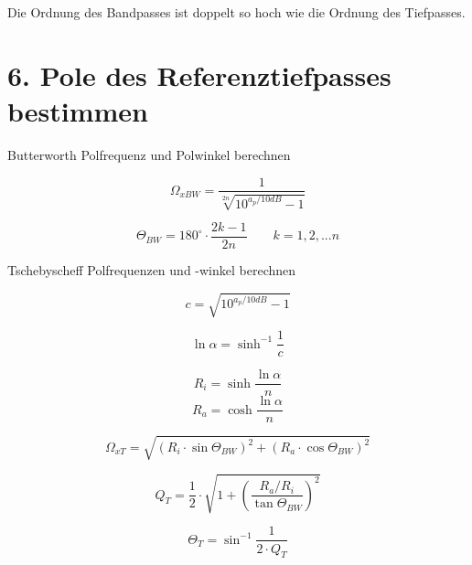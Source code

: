 \documentclass[a4paper, 12pt]{report}
\begin{document}
	\vspace{0.3cm}
	
	Die Ordnung des Bandpasses ist doppelt so hoch wie die Ordnung des Tiefpasses.
	
\section*{6. Pole des Referenztiefpasses bestimmen}
	Butterworth Polfrequenz und Polwinkel berechnen
	
	\begin{minipage}[t]{0.33\textwidth}
		\vspace{-0.5cm}
		\[ \Omega_{xBW} = \frac{1}{\sqrt[2n]{10^{a_p / 10dB} - 1}} \]
	\end{minipage}
	\begin{minipage}[t]{0.66\textwidth}
		\[ \Theta_{BW} = 180^{\circ} \cdot \frac{2k-1}{2n}  \qquad  k = 1, 2, ... n \]
	\end{minipage}
	
	\vspace{0.5cm}
	
	Tschebyscheff Polfrequenzen und -winkel berechnen

	\begin{minipage}[t]{0.33\textwidth}
			\[ c = \sqrt{10^{a_p / 10 dB} - 1} \]
	\end{minipage}
	\begin{minipage}[t]{0.33\textwidth}
			\vspace{0.4cm}
			\[ \ln{\alpha} = \sinh^{-1}{\frac{1}{c}} \]
	\end{minipage}
	\begin{minipage}[t]{0.33\textwidth}
			\[ R_i = \sinh{\frac{\ln{\alpha}}{n}} \]
			\[ R_a = \cosh{\frac{\ln{\alpha}}{n}} \]
	\end{minipage}
	
	\vspace{-0.5cm}
	
	\begin{minipage}[t]{0.6\textwidth}
		\[ \Omega_{xT} = \sqrt{(R_i \cdot \sin{\Theta_{BW}})^2 + (R_a \cdot \cos{\Theta_{BW}})^2} \]
	\end{minipage}
	
	\vspace{0.5cm}
	
	\begin{minipage}[t]{0.6\textwidth}
		\[ Q_T = \frac{1}{2} \cdot \sqrt{1 + \left(\frac{R_a / R_i}{\tan{\Theta_{BW}}}\right)^2} \]
	\end{minipage}
	\begin{minipage}[t]{0.4\textwidth}
		\[ \Theta_T = \sin^{-1}{\frac{1}{2 \cdot Q_T}} \]
	\end{minipage}
	
\end{document}
